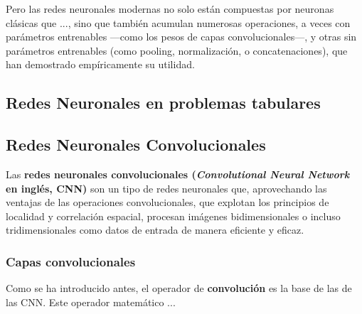 Pero las redes neuronales modernas no solo están compuestas por neuronas clásicas que ..., sino que también
acumulan numerosas operaciones, a veces con parámetros entrenables ---como los pesos de capas convolucionales---, 
y otras sin parámetros entrenables (como pooling, normalización, o concatenaciones), que han demostrado 
empíricamente su utilidad.





\subsection{Redes Neuronales en problemas tabulares}






\subsection{Redes Neuronales Convolucionales}

Las \textbf{redes neuronales convolucionales (\textit{Convolutional Neural Network} en inglés, CNN)} son un tipo de
redes neuronales que, aprovechando las ventajas de las operaciones convolucionales, que explotan los principios de 
localidad y correlación espacial, procesan imágenes bidimensionales o incluso tridimensionales como datos de entrada
de manera eficiente y eficaz.



\subsubsection{Capas convolucionales}

Como se ha introducido antes, el operador de \textbf{convolución} es la base de las de las CNN. Este operador 
matemático ...




